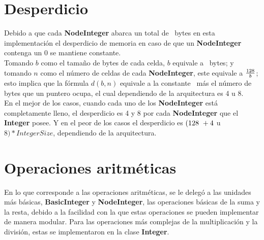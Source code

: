 \section{Desperdicio}
Debido a que cada \textbf{NodeInteger} abarca un total de \bytes\ bytes en esta
implementación el desperdicio de memoria en caso de que un \textbf{NodeInteger}
contenga un 0 se mantiene constante.\\
Tomando $b$ como el tamaño de bytes de cada celda, $b$ equivale a \base\
bytes; y tomando $n$ como el número de celdas de cada \textbf{NodeInteger}, este
equivale a $\frac{128}{b}$; esto implica que la fórmula $d(b, n)$ equivale a
la constante \bytes\ más el número de bytes que un puntero ocupa, el cual
dependiendo de la arquitectura es 4 u 8.\\
En el mejor de los casos, cuando cada uno de los \textbf{NodeInteger} está 
completamente lleno, el desperdicio es 4 y 8 por cada \textbf{NodeInteger} que el
\textbf{Integer} posee. Y en el peor de los casos el desperdicio es $(128\ + 4$
u $8) * IntegerSize$, dependiendo de la arquitectura.
\section{Operaciones aritméticas}
En lo que corresponde a las operaciones aritméticas, se le delegó a las unidades
más básicas, \textbf{BasicInteger} y \textbf{NodeInteger}, las operaciones
básicas de la suma y la resta, debido a la facilidad con la que estas
operaciones se pueden implementar de manera modular. Para las operaciones más
complejas de la multiplicación y la división, estas se implementaron en la clase
\textbf{Integer}.
